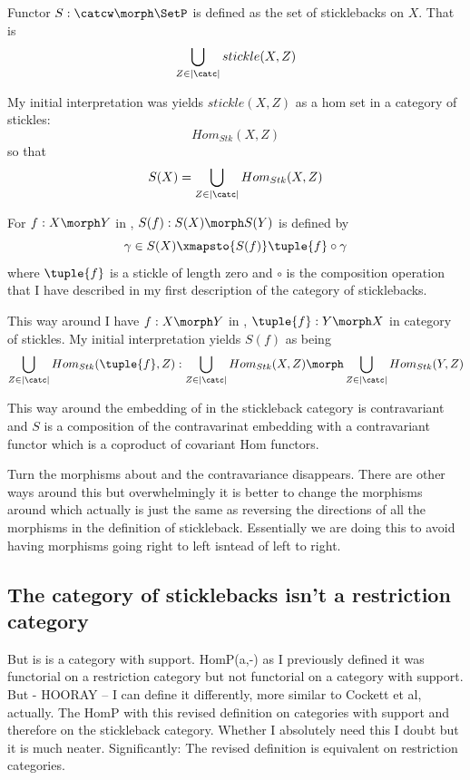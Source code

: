 Functor $S:\catcw \morph \SetP$ is defined as the set of sticklebacks on $X$. That is 
\[ 
\bigcup_{Z \in |\catc|} stickle(X,Z)
\]

My initial interpretation was yields $stickle(X,Z)$ as a hom set in a category of stickles:
\[ Hom_{Stk}(X,Z)\]
so that 
\[
S(X)=\bigcup_{Z \in |\catc|}Hom_{Stk}(X,Z)
\]

For $f:X \morph Y$ in \catcw, $S(f):S(X) \morph S(Y)$ is defined by
\[
\gamma \in S(X) \xmapsto{S(f)} \tuple{f} \circ \gamma
\]
where $\tuple{f}$ is a stickle of length zero and $\circ$ is the composition operation that I have described in my first description of the category of sticklebacks.

This way around I have $f: X \morph Y$ in \catcw, $\tuple{f}: Y \morph X$ in 
category of stickles. My initial interpretation yields $S(f)$ as being
\[
\bigcup_{Z \in |\catc|} Hom_{Stk}(\tuple{f},Z) : \bigcup_{Z \in |\catc|}Hom_{Stk}(X,Z) \morph \bigcup_{Z \in |\catc|} Hom_{Stk}(Y,Z)
\] 

This way around the embedding of \catcw in the stickleback category is contravariant and  $S$ is a composition of the contravarinat embedding with a contravariant functor which is a coproduct of covariant Hom functors. 

Turn the morphisms about and the contravariance disappears. There are other ways around this but overwhelmingly it is better to change the morphisms around which actually is just the same as reversing the directions of all the morphisms in the definition of stickleback. Essentially we are doing this to avoid having morphisms going right to left isntead of left to right.

\subsection{The category of sticklebacks isn't a restriction category}
But is is a category with support. HomP(a,-) as I previously defined it was
functorial on a restriction category but not functorial on a category with support. 
But - HOORAY -- I can define it differently, more similar to Cockett et al, actually.
The HomP with this revised definition on categories with support and therefore on the stickleback category. Whether I absolutely need this I doubt but it is much neater.
Significantly: The revised definition is equivalent on restriction categories.
 
